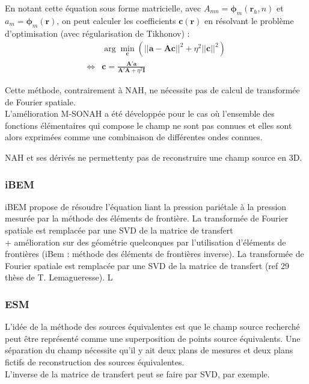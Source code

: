  En notant cette équation sous forme matricielle, avec $A_{mn} =\bm{\phi}_m(\bm{r}_h,n)$ et $a_m= \bm{\phi}_m(\bm{r})$, on peut calculer les coefficients $\bm{c}(\bm{r})$ en résolvant le problème d'optimisation (avec régularisation de Tikhonov) : 
 \begin{align}
	~& \arg\min_{\bm{c}} \left( ||\bm{a}-\bm{Ac}||^2 + \eta^2||\bm{c}||^2\right)\\
	\Leftrightarrow & \bm{c} = \frac{\bm{A}'\bm{a}}{\bm{A}'\bm{A} + \eta^2\bm{I}} 
\end{align}

 
 Cette méthode, contrairement à NAH, ne nécessite pas de calcul de transformée de Fourier spatiale.\\

 L'amélioration M-SONAH a été développée pour le cas où l'ensemble des fonctions élémentaires qui compose le champ ne sont pas connues et elles sont alors exprimées comme une combinaison de différentes ondes connues.

NAH et ses dérivés ne permettenty pas de reconstruire une champ source en 3D.

\subsubsection{iBEM}

iBEM propose de résoudre l'équation liant la pression pariétale à  la pression mesurée par la méthode des éléments de frontière.  La transformée de Fourier spatiale est remplacée par une SVD de la matrice de transfert\\
 

+ amélioration sur des géométrie quelconques par l'utilisation d'éléments de frontières (iBem : méthode des éléments de frontières inverse). La transformée de Fourier spatiale est remplacée par une SVD de la matrice de transfert (ref 29 thèse de T. Lemagueresse). L
\subsubsection{ESM}
L'idée de la méthode des sources équivalentes est que le champ source recherché peut être représenté comme une superposition de points source équivalents. Une séparation du champ nécessite qu'il y ait deux plans de mesures et deux plans fictifs de reconstruction des sources équivalentes.\\
L'inverse de la matrice de transfert peut se faire par SVD, par exemple.



